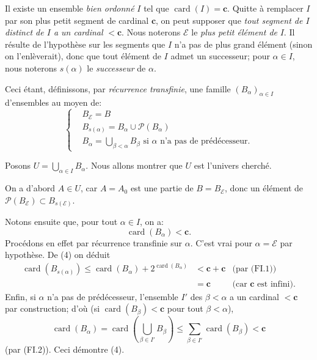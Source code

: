 \documentclass[12pt]{article}
\newcommand{\card}{\operatorname{card}}
\begin{document}
Il existe un ensemble \emph{bien ordonné} $I$ tel que $\card(I)=\mathbf c$. Quitte à remplacer $I$ par son plus petit segment de cardinal $\mathbf c$, on peut supposer que \emph{tout segment de $I$ distinct de $I$ a un cardinal} $ < \mathbf c$. Nous noterons $\mathcal{E}$ le \emph{plus petit élément de} $I$. Il résulte de l'hypothèse sur les segments que $I$ n'a pas de plus grand élément (sinon on l'enlèverait), donc que tout élément de $I$ admet un successeur;
pour $\alpha \in I$, nous noterons $s(\alpha)$ le \emph{successeur} de $\alpha$. 

Ceci étant, définissons, par \emph{récurrence transfinie}, une famille $(B_{\alpha})_{\alpha\in I}$ d'ensembles au moyen de:
\begin{equation*}
\begin{cases}& B_{\mathcal{E}}=B\\ & B_{s(\alpha)}=B_{\alpha}\cup \mathcal{P}(B_{\alpha})\\ & B_{\alpha}={\displaystyle{\bigcup_{\beta < \alpha}}}B_{\beta}\text{ si $\alpha$ n'a pas de prédécesseur.}
\end{cases}\tag{3}
\end{equation*}

Posons $U=\bigcup_{\alpha\in I}B_{\alpha}$. Nous allons montrer que $U$ est l'univers cherché.

On a d'abord $A\in U$, car $A=A_0$ est une partie de $B=B_{\mathcal{E}}$, donc un élément de $\mathcal{P}(B_{\mathcal{E}})\subset B_{s(\mathcal{E})}$.

Notons ensuite que, pour tout $\alpha \in I$, on a:
\begin{equation*}
\card(B_{\alpha}) < \mathbf c.\tag{4}
\end{equation*}
Procédons en effet par récurrence transfinie sur $\alpha$. C'est vrai pour $\alpha=\mathcal{E}$ par hypothèse. De (4) on déduit 
\begin{align*}
\card(B_{s(\alpha)})\leq\card(B_{\alpha})+2^{\card(B_\alpha)}&<\mathbf c+\mathbf c&\text{(par (FI.1))}\\ 
&=\mathbf c&\text{(car $\mathbf c$ est infini).}
\end{align*}
Enfin, si $\alpha$ n'a pas de prédécesseur, l'ensemble $I'$ des $\beta < \alpha$ a un cardinal $ < \mathbf c$ par construction; d'où (si $\card(B_{\beta}) < \mathbf c$ pour tout $\beta < \alpha$), 
$$
\card(B_{\alpha})=\card\left(\bigcup_{\beta\in I'}B_{\beta}\right) \leq \sum_{\beta\in
I'}\card(B_{\beta}) < \mathbf c
$$ 
(par (FI.2)). Ceci démontre (4).
\end{document}
